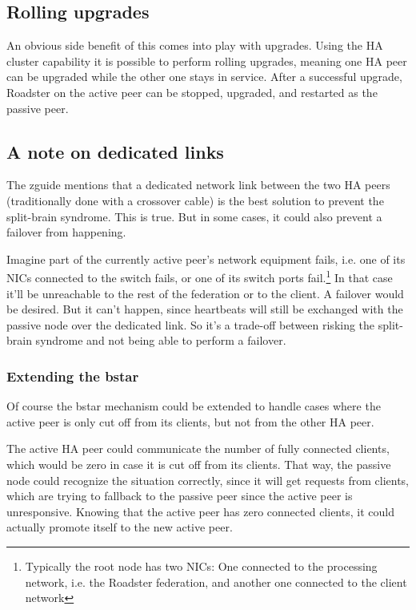 \subsection{Rolling upgrades}
An obvious side benefit of this comes into play with upgrades. Using the HA
cluster capability it is possible to perform rolling upgrades, meaning one HA
peer can be upgraded while the other one stays in service. After a successful
upgrade, Roadster on the active peer can be stopped, upgraded, and restarted as
the passive peer.

\subsection{A note on dedicated links}
The \gls{zguide} mentions that a dedicated network link between the two HA peers
(traditionally done with a crossover cable) is the best solution to prevent the
split-brain syndrome. This is true. But in some cases, it could also prevent a
failover from happening.

Imagine part of the currently active peer's network equipment fails, i.e. one
of its \glspl{NIC} connected to the switch fails, or one of its switch ports
fail.\footnote{Typically the root node has two NICs: One connected to the
processing network, i.e. the Roadster federation, and another one connected to
the client network} In that case it'll be unreachable to the rest of the
federation or to the client. A failover would be desired. But it
can't happen, since heartbeats will still be exchanged with the passive node over
the dedicated link. So it's a trade-off between risking the split-brain
syndrome and not being able to perform a failover.

\subsubsection{Extending the \gls{bstar}}\label{sec:approach:ha:bstar-ext}
Of course the \gls{bstar} mechanism could be extended to handle cases where the
active peer is only cut off from its clients, but not from the other HA peer.

The active HA peer could communicate the number of fully connected clients,
which would be zero in case it is cut off from its clients. That way, the
passive node could recognize the situation correctly, since it will get
requests from clients, which are trying to fallback to the passive peer since
the active peer is unresponsive. Knowing that the active peer has zero
connected clients, it could actually promote itself to the new active peer.

